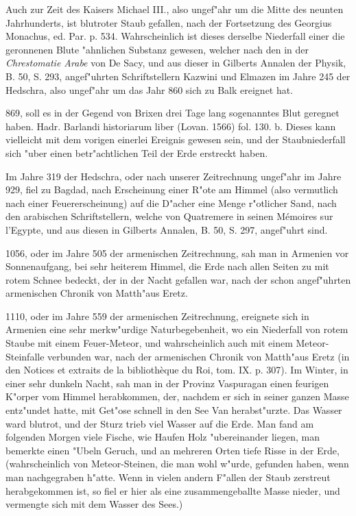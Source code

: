 \documentclass[a4paper, 11pt, oneside, polutonikogreek, german]{article}
\begin{document}
Auch zur Zeit des Kaisers Michael III., also ungef"ahr um die Mitte des neunten Jahrhunderts, ist blutroter Staub gefallen, nach der Fortsetzung des Georgius Monachus, ed. Par. p. 534. Wahrscheinlich ist dieses derselbe Niederfall einer die geronnenen Blute "ahnlichen Substanz gewesen, welcher nach den in der \emph{Chrestomatie Arabe} von De Sacy, und aus dieser in Gilberts Annalen der Physik, B. 50, S. 293, angef"uhrten Schriftstellern Kazwini und Elmazen im Jahre 245 der Hedschra, also ungef"ahr um das Jahr 860 sich zu Balk ereignet hat.

869, soll es in der Gegend von Brixen drei Tage lang sogenanntes Blut geregnet haben. Hadr. Barlandi historiarum liber (Lovan. 1566) fol. 130. b. Dieses kann vielleicht mit dem vorigen einerlei Ereignis gewesen sein, und der Staubniederfall sich "uber einen betr"achtlichen Teil der Erde erstreckt haben.

Im Jahre 319 der Hedschra, oder nach unserer Zeitrechnung ungef"ahr im Jahre 929, fiel zu Bagdad, nach Erscheinung einer R"ote am Himmel (also vermutlich nach einer Feuererscheinung) auf die D"acher eine Menge r"otlicher Sand, nach den arabischen Schriftstellern, welche von Quatremere in seinen Mémoires sur l'Egypte, und aus diesen in Gilberts Annalen, B. 50, S. 297, angef"uhrt sind.

1056, oder im Jahre 505 der armenischen Zeitrechnung, sah man in Armenien vor Sonnenaufgang, bei sehr heiterem Himmel, die Erde nach allen Seiten zu mit rotem Schnee bedeckt, der in der Nacht gefallen war, nach der schon angef"uhrten armenischen Chronik von Matth"aus Eretz.

1110, oder im Jahre 559 der armenischen Zeitrechnung, ereignete sich in Armenien eine sehr merkw"urdige Naturbegebenheit, wo ein Niederfall von rotem Staube mit einem Feuer-Meteor, und wahrscheinlich auch mit einem Meteor-Steinfalle verbunden war, nach der armenischen Chronik von Matth"aus Eretz (in den Notices et extraits de la bibliothèque du Roi, tom. IX. p. 307). Im Winter, in einer sehr dunkeln Nacht, sah man in der Provinz Vaspuragan einen feurigen K"orper vom Himmel herabkommen, der, nachdem er sich in seiner ganzen Masse entz"undet hatte, mit Get"ose schnell in den See Van herabst"urzte. Das Wasser ward blutrot, und der Sturz trieb viel Wasser auf die Erde. Man fand am folgenden Morgen viele Fische, wie Haufen Holz "ubereinander liegen, man bemerkte einen "Ubeln Geruch, und an mehreren Orten tiefe Risse in der Erde, (wahrscheinlich von Meteor-Steinen, die man wohl w"urde, gefunden haben, wenn man nachgegraben h"atte. Wenn in vielen andern F"allen der Staub zerstreut herabgekommen ist, so fiel er hier als eine zusammengeballte Masse nieder, und vermengte sich mit dem Wasser des Sees.)
\end{document}
